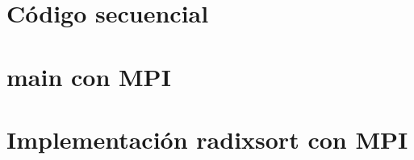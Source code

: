 \documentclass[a4paper]{article}
\begin{document}
\section{Código secuencial}\label{secuencial.c}



\section{main con MPI}\label{main.c}


\section{Implementación radixsort con MPI}\label{radixsort_mpi.c}

\end{document}
